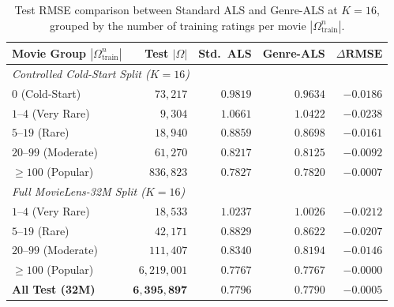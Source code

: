 \documentclass{article}
\theoremstyle{plain}
\theoremstyle{definition}
\begin{document}
\begin{table}[t]
\caption{Test RMSE comparison between Standard ALS and Genre-ALS at $K=16$, grouped by the number of training ratings per movie $|\Omega_{\text{train}}^n|$.}
\label{tab:genre_coldstart_results}
\vskip 0.1in
\begin{center}
\begin{scriptsize}
\setlength{\tabcolsep}{3.5pt}
\begin{tabular}{lrrrr}
\toprule
\textbf{Movie Group} $|\Omega_{\text{train}}^n|$ & \textbf{Test} $|\Omega|$ & \textbf{Std.\ ALS} & \textbf{Genre-ALS} & $\Delta\textbf{RMSE}$ \\
\midrule
\multicolumn{5}{l}{\emph{Controlled Cold-Start Split ($K=16$)}} \\
$0$ (Cold-Start) & $73,217$ & $0.9819$ & $\mathbf{0.9634}$ & $\mathbf{-0.0186}$ \\
$1\text{--}4$ (Very Rare) & $9,304$ & $1.0661$ & $\mathbf{1.0422}$ & $\mathbf{-0.0238}$ \\
$5\text{--}19$ (Rare) & $18,940$ & $0.8859$ & $\mathbf{0.8698}$ & $\mathbf{-0.0161}$ \\
$20\text{--}99$ (Moderate) & $61,270$ & $0.8217$ & $\mathbf{0.8125}$ & $\mathbf{-0.0092}$ \\
$\ge 100$ (Popular) & $836,823$ & $0.7827$ & $\mathbf{0.7820}$ & $\mathbf{-0.0007}$ \\
\midrule
\multicolumn{5}{l}{\emph{Full MovieLens-32M Split ($K=16$)}} \\
$1\text{--}4$ (Very Rare) & $18,533$ & $1.0237$ & $\mathbf{1.0026}$ & $\mathbf{-0.0212}$ \\
$5\text{--}19$ (Rare) & $42,171$ & $0.8829$ & $\mathbf{0.8622}$ & $\mathbf{-0.0207}$ \\
$20\text{--}99$ (Moderate) & $111,407$ & $0.8340$ & $\mathbf{0.8194}$ & $\mathbf{-0.0146}$ \\
$\ge 100$ (Popular) & $6,219,001$ & $0.7767$ & $\mathbf{0.7767}$ & $-0.0000$ \\
\textbf{All Test (32M)} & $\mathbf{6,395,897}$ & $0.7796$ & $\mathbf{0.7790}$ & $\mathbf{-0.0005}$ \\
\bottomrule
\end{tabular}
\end{scriptsize}
\end{center}
\vskip -0.1in
\end{table}
\end{document}

